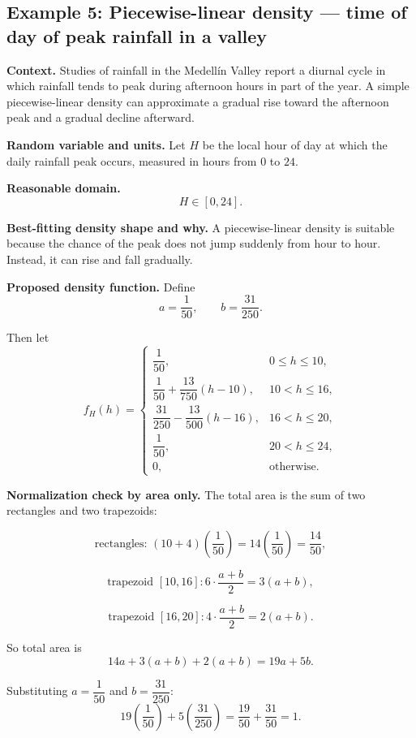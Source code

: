 \documentclass[11pt]{article}
\begin{document}
	\subsection{Example 5: Piecewise-linear density --- time of day of peak rainfall in a valley}
	
	\textbf{Context.} Studies of rainfall in the Medell\'in Valley report a diurnal cycle in which rainfall tends to peak during afternoon hours in part of the year. A simple piecewise-linear density can approximate a gradual rise toward the afternoon peak and a gradual decline afterward.
	
	\textbf{Random variable and units.} Let $H$ be the local hour of day at which the daily rainfall peak occurs, measured in hours from $0$ to $24$.
	
	\textbf{Reasonable domain.}
	\[
	H\in[0,24].
	\]
	
	\textbf{Best-fitting density shape and why.} A piecewise-linear density is suitable because the chance of the peak does not jump suddenly from hour to hour. Instead, it can rise and fall gradually.
	
	\textbf{Proposed density function.} Define
	\[
	a=\frac{1}{50},
	\qquad
	b=\frac{31}{250}.
	\]
	
	Then let
	\[
	f_H(h)=
	\begin{cases}
		\dfrac{1}{50}, & 0\le h\le 10,\\[6pt]
		\dfrac{1}{50}+\dfrac{13}{750}(h-10), & 10<h\le 16,\\[8pt]
		\dfrac{31}{250}-\dfrac{13}{500}(h-16), & 16<h\le 20,\\[8pt]
		\dfrac{1}{50}, & 20<h\le 24,\\
		0, & \text{otherwise}.
	\end{cases}
	\]
	
	\textbf{Normalization check by area only.} The total area is the sum of two rectangles and two trapezoids:
	
	\[
	\text{rectangles: } (10+4)\left(\frac{1}{50}\right)=14\left(\frac{1}{50}\right)=\frac{14}{50},
	\]
	
	\[
	\text{trapezoid }[10,16]: 6\cdot \frac{a+b}{2}=3(a+b),
	\]
	
	\[
	\text{trapezoid }[16,20]: 4\cdot \frac{a+b}{2}=2(a+b).
	\]
	
	So total area is
	\[
	14a+3(a+b)+2(a+b)=19a+5b.
	\]
	
	Substituting $a=\dfrac{1}{50}$ and $b=\dfrac{31}{250}$:
	\[
	19\left(\frac{1}{50}\right)+5\left(\frac{31}{250}\right)
	=\frac{19}{50}+\frac{31}{50}=1.
	\]
	
\end{document}
